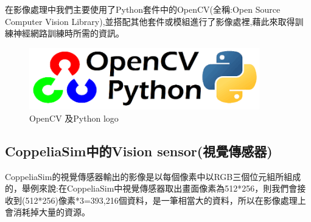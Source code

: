 \documentclass[14pt,a4paper]{report}  %
\begin{document}
\qquad 在影像處理中我們主要使用了Python套件中的OpenCV(全稱:Open Source Computer Vision Library),並搭配其他套件或模組進行了影像處裡,藉此來取得訓練神經網路訓練時所需的資訊。\\
\begin{figure}[hbt!]
\center
\includegraphics[width=10cm]{pythonCVlogo}
\caption{\Large OpenCV 及Python logo}
\end{figure}

\subsection{CoppeliaSim中的Vision sensor(視覺傳感器)}
\qquad CoppeliaSim的視覺傳感器輸出的影像是以每個像素中以RGB三個位元組所組成的，舉例來說:在CoppeliaSim中視覺傳感器取出畫面像素為512*256，則我們會接收到(512*256)像素*3=393,216個資料，是一筆相當大的資料，所以在影像處理上會消耗掉大量的資源。\\
\end{document}
